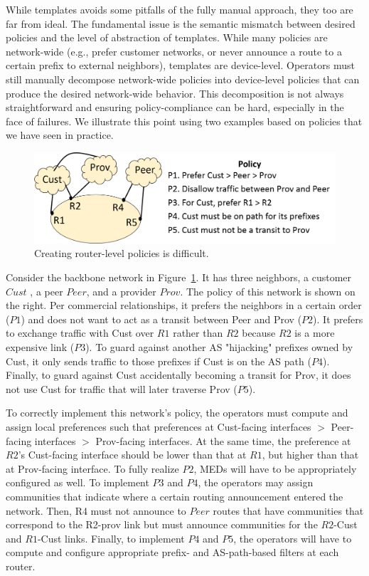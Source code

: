 While templates avoids some pitfalls of the fully manual approach, they too are far from ideal. The fundamental issue is the semantic mismatch between desired policies and the level of abstraction of templates. While many policies are network-wide (e.g., prefer customer networks, or never announce a route to a certain prefix to external neighbors), templates are device-level. Operators must still manually decompose network-wide policies into device-level policies that can produce the desired network-wide behavior.
This decomposition is not always straightforward and ensuring policy-compliance can be hard, especially in the face of failures. We illustrate this point using two examples based on policies that we have seen in practice.

\begin{figure}[t!]
\centering
\includegraphics[width=\columnwidth]{figures/example1}
\caption{Creating router-level policies is difficult.}
\label{fig:example1}
\end{figure}



Consider the backbone network in Figure~\ref{fig:example1}. It has three neighbors, a customer $Cust$ , a peer $Peer$, and a provider $Prov$. The policy of this network is shown on the right. Per commercial relationships, it prefers the neighbors in a certain order ($P1$) and does not want to act as a transit between Peer and Prov ($P2$). It prefers to exchange traffic with Cust over $R1$ rather than $R2$ because $R2$ is a more expensive link ($P3$). To guard against another AS "hijacking" prefixes owned by Cust, it only sends traffic to those prefixes if Cust is on the AS path ($P4$). Finally, to guard against Cust accidentally becoming a transit for Prov, it does not use Cust for traffic that will later traverse Prov ($P5$).

To correctly implement this network's policy, the operators must compute and assign local preferences such that preferences at Cust-facing interfaces $>$ Peer-facing interfaces $>$ Prov-facing interfaces. At the same time, the preference at $R2$'s Cust-facing interface should be lower than that at $R1$, but higher than that at Prov-facing interface. To fully realize $P2$, MEDs will have to be appropriately configured as well. To implement $P3$ and $P4$, the operators may assign communities that indicate where a certain routing announcement entered the network. Then, R4 must not announce to $Peer$ routes that have communities that correspond to the R2-prov link but must announce communities for the $R2$-Cust and $R1$-Cust links. Finally, to implement $P4$ and $P5$, the operators will have to compute and configure appropriate prefix- and AS-path-based filters at each router.

